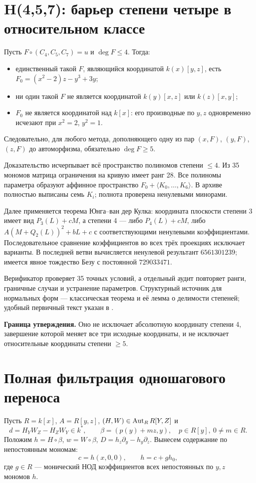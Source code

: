 \section{H(4,5,7): барьер степени четыре в относительном классе}\label{sec:h457}
Пусть $F\circ(C_4,C_5,C_7)=u$ и $\deg F\le4$. Тогда:
\begin{itemize}
\item единственный такой $F$, являющийся координатой $k(x)[y,z]$, есть $F_0=(x^2-2)z-y^3+3y$;
\item ни один такой $F$ не является координатой $k(y)[x,z]$ или $k(z)[x,y]$;
\item $F_0$ не является координатой над $k[x]$: его производные по $y,z$ одновременно исчезают при $x^2=2$, $y^2=1$.
\end{itemize}
Следовательно, для любого метода, дополняющего одну из пар $(x,F)$, $(y,F)$, $(z,F)$ до автоморфизма, обязательно $\deg F\ge5$.

Доказательство исчерпывает всё пространство полиномов степени $\le4$. Из 35 мономов матрица ограничения на кривую имеет ранг 28. Все полиномы параметра образуют аффинное пространство $F_0+\langle K_0,\ldots,K_6\rangle$. В архиве полностью выписаны семь $K_i$; полнота проверена ненулевыми минорами.

Далее применяется теорема Юнга--ван дер Кулка: координата плоскости степени 3 имеет вид $P_3(L)+cM$, а степени 4 --- либо $P_4(L)+cM$, либо $A(M+Q_2(L))^2+bL+c$ с соответствующими ненулевыми коэффициентами. Последовательное сравнение коэффициентов во всех трёх проекциях исключает варианты. В последней ветви вычисляется ненулевой результант $6561301239$; имеется явное тождество Безу с постоянной $729033471$.

Верификатор проверяет 35 точных условий, а отдельный аудит повторяет ранги, граничные случаи и устранение параметров. Структурный источник для нормальных форм --- классическая теорема и её лемма о делимости степеней; удобный первичный текст указан в \cite{Chau}.

\textbf{Граница утверждения.} Оно не исключает абсолютную координату степени 4, завершение которой меняет все три исходные координаты, и не исключает относительные координаты степени $\ge5$.

\section{Полная фильтрация одношагового переноса}\label{sec:transfer}
Пусть $R=k[x]$, $A=R[y,z]$, $(H,W)\in\operatorname{Aut}_R R[Y,Z]$ и
\[
d=H_YW_Z-H_ZW_Y\in k^*,\qquad
\beta=(p(y)+mz,y),\quad p\in R[y],\ 0\ne m\in R.
\]
Положим $h=H\circ\beta$, $w=W\circ\beta$, $D=h_z\partial_y-h_y\partial_z$.
Вынесем содержание по непостоянным мономам:
\[
c=h(x,0,0),\qquad h=c+g h_0,
\]
где $g\in R$ --- монический НОД коэффициентов всех непостоянных по $y,z$ мономов $h$.

